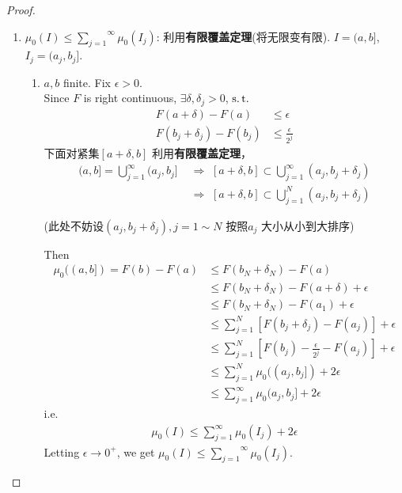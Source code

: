\begin{enumerate}
\begin{proof}
\begin{enumerate}
				\item $\mu_0(I) \leq \overset{\infty}{\underset{j = 1}{\sum}}{\mu_0(I_j)}$: 利用\textbf{有限覆盖定理}(将无限变有限). $I = (a , b]$, $I_j = (a_j , b_j]$.
				\begin{enumerate}
					\item $a , b$ finite. Fix $\epsilon > 0$. \\
					Since $F$ is right continuous, $\exists \delta , \delta_j > 0$, $\operatorname{s.t.}$
					\begin{align}
						F(a + \delta) - F(a) &\leq \epsilon \\
						F(b_j + \delta_j) - F(b_j) &\leq \frac{\epsilon}{2^j}
					\end{align}
					下面对紧集$[a + \delta , b]$ 利用\textbf{有限覆盖定理}，
					\begin{align}
						(a , b] = \bigcup_{j = 1}^{\infty}{(a_j , b_j]} \,\, &\Rightarrow \,\, [a + \delta , b] \subset \bigcup_{j = 1}^{\infty}{(a_j , b_j + \delta_j)} \\
						&\Rightarrow \,\, [a + \delta , b] \subset \bigcup_{j = 1}^{N}{(a_j , b_j + \delta_j)}
					\end{align}
					\begin{center}
						(此处不妨设$(a_j , b_j + \delta_j) , j = 1 \sim N$ 按照$a_j$ 大小从小到大排序)
					\end{center}
					Then
					\begin{align}
						\mu_0((a , b]) 
						= F(b) - F(a) 
						&\leq F(b_N + \delta_N) - F(a) \\
						&\leq F(b_N+  \delta_N) - F(a + \delta) + \epsilon \\
						&\leq F(b_N+  \delta_N) - F(a_1) + \epsilon \\
						&\leq \sum_{j = 1}^{N}{\left[ F(b_j + \delta_j) - F(a_j) \right]} + \epsilon \\
						&\leq \sum_{j = 1}^{N}{\left[ F(b_j) - \frac{\epsilon}{2^j} - F(a_j) \right]} + \epsilon \\
						&\leq \sum_{j = 1}^{N}{\mu_0((a_j , b_j])} + 2\epsilon \\
						&\leq \sum_{j = 1}^{\infty}{\mu_0(a_j , b_j]} + 2\epsilon
					\end{align}
					i.e.
					\begin{align}
						\mu_0(I) \leq \sum_{j = 1}^{\infty}\mu_0(I_j) + 2\epsilon
					\end{align}
					Letting $\epsilon \to 0^{+}$, we get $\mu_0(I) \leq \overset{\infty}{\underset{j = 1}{\sum}}{\mu_0(I_j)}$.
					

\end{enumerate}
\end{enumerate}
\end{proof}
\end{enumerate}
